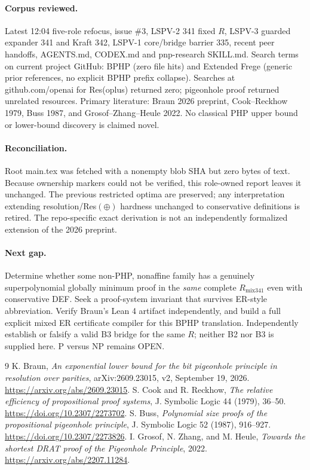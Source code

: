 \documentclass[11pt]{article}
\begin{document}
\paragraph{Corpus reviewed.} Latest 12:04 five-role refocus, issue \#3, LSPV-2 341 fixed $R$, LSPV-3 guarded expander 341 and Kraft 342, LSPV-1 core/bridge barrier 335, recent peer handoffs, AGENTS.md, CODEX.md and pnp-research SKILL.md. Search terms on current project GitHub: BPHP (zero file hits) and Extended Frege (generic prior references, no explicit BPHP prefix collapse). Searches at github.com/openai for Res(oplus) returned zero; pigeonhole proof returned unrelated resources. Primary literature: Braun 2026 preprint, Cook--Reckhow 1979, Buss 1987, and Grosof--Zhang--Heule 2022. No classical PHP upper bound or lower-bound discovery is claimed novel.

\paragraph{Reconciliation.} Root main.tex was fetched with a nonempty blob SHA but zero bytes of text. Because ownership markers could not be verified, this role-owned report leaves it unchanged. The previous restricted optima are preserved; any interpretation extending resolution/Res$(\oplus)$ hardness unchanged to conservative definitions is retired. The repo-specific exact derivation is not an independently formalized extension of the 2026 preprint.

\paragraph{Next gap.} Determine whether some non-PHP, nonaffine family has a genuinely superpolynomial globally minimum proof in the \emph{same} complete $R_{\mathrm{mix341}}$ even with conservative DEF. Seek a proof-system invariant that survives ER-style abbreviation. Verify Braun's Lean 4 artifact independently, and build a full explicit mixed ER certificate compiler for this BPHP translation. Independently establish or falsify a valid B3 bridge for the same $R$; neither B2 nor B3 is supplied here. P versus NP remains OPEN.

\begin{thebibliography}{9}
 K. Braun, \emph{An exponential lower bound for the bit pigeonhole principle in resolution over parities}, arXiv:2609.23015, v2, September 19, 2026. \url{https://arxiv.org/abs/2609.23015}.
 S. Cook and R. Reckhow, \emph{The relative efficiency of propositional proof systems}, J. Symbolic Logic 44 (1979), 36--50. \url{https://doi.org/10.2307/2273702}.
 S. Buss, \emph{Polynomial size proofs of the propositional pigeonhole principle}, J. Symbolic Logic 52 (1987), 916--927. \url{https://doi.org/10.2307/2273826}.
 I. Grosof, N. Zhang, and M. Heule, \emph{Towards the shortest DRAT proof of the Pigeonhole Principle}, 2022. \url{https://arxiv.org/abs/2207.11284}.
\end{thebibliography}
\end{document}
